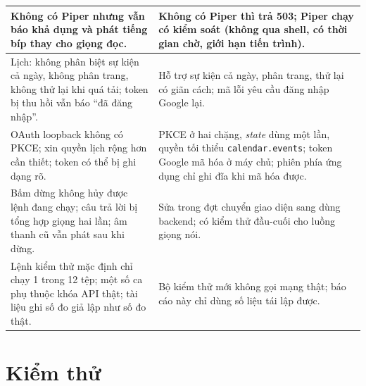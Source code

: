 {\begin{longtable}{|L{7.1cm}|L{7.6cm}|}
Không có Piper nhưng vẫn báo khả dụng và phát tiếng bíp thay cho giọng đọc. & Không có Piper thì trả 503; Piper chạy có kiểm soát (không qua shell, có thời gian chờ, giới hạn tiến trình).\\\hline
Lịch: không phân biệt sự kiện cả ngày, không phân trang, không thử lại khi quá tải; token bị thu hồi vẫn báo “đã đăng nhập”. & Hỗ trợ sự kiện cả ngày, phân trang, thử lại có giãn cách; mã lỗi yêu cầu đăng nhập Google lại.\\\hline
OAuth loopback không có PKCE; xin quyền lịch rộng hơn cần thiết; token có thể bị ghi dạng rõ. & PKCE ở hai chặng, \textit{state} dùng một lần, quyền tối thiểu \texttt{calendar.events}; token Google mã hóa ở máy chủ; phiên phía ứng dụng chỉ ghi đĩa khi mã hóa được.\\\hline
Bấm dừng không hủy được lệnh đang chạy; câu trả lời bị tổng hợp giọng hai lần; âm thanh cũ vẫn phát sau khi dừng. & Sửa trong đợt chuyển giao diện sang dùng backend; có kiểm thử đầu-cuối cho luồng giọng nói.\\\hline
Lệnh kiểm thử mặc định chỉ chạy 1 trong 12 tệp; một số ca phụ thuộc khóa API thật; tài liệu ghi số đo giả lập như số đo thật. & Bộ kiểm thử mới không gọi mạng thật; báo cáo này chỉ dùng số liệu tái lập được.\\\hline
\end{longtable}}

\section{Kiểm thử}
